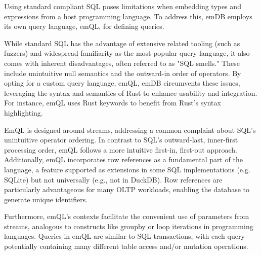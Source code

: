 \documentclass[conference]{IEEEtran}
\begin{document}

Using standard compliant SQL poses limitations when embedding types and expressions
from a host programming language. To address this, emDB employs its own query language,
emQL, for defining queries.

While standard SQL has the advantage of extensive related tooling (such as fuzzers)
and widespread familiarity as the most popular query language, it also comes with
inherent disadvantages, often referred to as "SQL smells." These include unintuitive
null semantics and the outward-in order of operators. By opting for a custom query
language, emQL, emDB circumvents these issues, leveraging the syntax and semantics
of Rust to enhance usability and integration. For instance, emQL uses Rust keywords
to benefit from Rust's syntax highlighting.

EmQL is designed around streams, addressing a common complaint about SQL's
unintuitive operator ordering. In contrast to SQL's outward-last, inner-first
processing order, emQL follows a more intuitive first-in, first-out approach.
Additionally, emQL incorporates row references as a fundamental part of the
language, a feature supported as extensions in some SQL implementations (e.g.
SQLite) but not universally (e.g., not in DuckDB). Row references are particularly
advantageous for many OLTP workloads, enabling the database to generate unique
identifiers.

Furthermore, emQL's contexts facilitate the convenient use of parameters from
streams, analogous to constructs like groupby or loop iterations in programming
languages. Queries in emQL are similar to SQL transactions, with each query potentially
containing many different table access and/or mutation operations.
\end{document}
